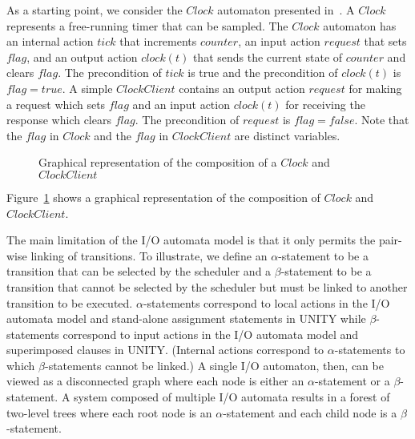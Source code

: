 As a starting point, we consider the $Clock$ automaton presented in~\cite{nancy1996distributed}.
A $Clock$ represents a free-running timer that can be sampled.
The $Clock$ automaton has an internal action $tick$ that increments $counter$, an input action $request$ that sets $flag$, and an output action $clock(t)$ that sends the current state of $counter$ and clears $flag$.
The precondition of $tick$ is true and the precondition of $clock(t)$ is $flag = true$.
A simple $ClockClient$ contains an output action $request$ for making a request which sets $flag$ and an input action $clock(t)$ for receiving the response which clears $flag$.
The precondition of $request$ is $flag = false$.
Note that the $flag$ in $Clock$ and the $flag$ in $ClockClient$ are distinct variables.

\begin{figure}
{

\centerline{\box\graph}
}
\caption{Graphical representation of the composition of a $Clock$ and $ClockClient$\label{clock_automaton}}
\end{figure}

Figure~\ref{clock_automaton} shows a graphical representation of the composition of $Clock$ and $ClockClient$.




The main limitation of the I/O automata model is that it only permits the pair-wise linking of transitions.
To illustrate, we define an $\alpha$-statement to be a transition that can be selected by the scheduler and a $\beta$-statement to be a transition that cannot be selected by the scheduler but must be linked to another transition to be executed.
$\alpha$-statements correspond to local actions in the I/O automata model and stand-alone assignment statements in UNITY while $\beta$-statements correspond to input actions in the I/O automata model and superimposed clauses in UNITY.
(Internal actions correspond to $\alpha$-statements to which $\beta$-statements cannot be linked.)
A single I/O automaton, then, can be viewed as a disconnected graph where each node is either an $\alpha$-statement or a $\beta$-statement.
A system composed of multiple I/O automata results in a forest of two-level trees where each root node is an $\alpha$-statement and each child node is a $\beta$-statement.



